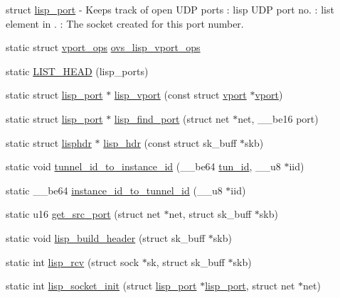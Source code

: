struct \hyperlink{structlisp__port}{lisp\+\_\+port} -\/ Keeps track of open U\+D\+P ports \+: lisp U\+D\+P port no. \+: list element in . \+: The socket created for this port number. \begin{DoxyCompactItemize}
\item 
static struct \hyperlink{structvport__ops}{vport\+\_\+ops} \hyperlink{linux_2vport-lisp_8c_a758306cfbd9fe092cc094dbf165e5cf7}{ovs\+\_\+lisp\+\_\+vport\+\_\+ops}
\item 
static \hyperlink{linux_2vport-lisp_8c_a73d3f5ee301d4ee3135ff6fdecaebbe5}{L\+I\+S\+T\+\_\+\+H\+E\+A\+D} (lisp\+\_\+ports)
\item 
static struct \hyperlink{structlisp__port}{lisp\+\_\+port} $\ast$ \hyperlink{linux_2vport-lisp_8c_af8f69fb0b9db12e9a324a9932011b302}{lisp\+\_\+vport} (const struct \hyperlink{structvport}{vport} $\ast$\hyperlink{structvport}{vport})
\item 
static struct \hyperlink{structlisp__port}{lisp\+\_\+port} $\ast$ \hyperlink{linux_2vport-lisp_8c_ac170aebcefa72b3bccd6431da43de59d}{lisp\+\_\+find\+\_\+port} (struct net $\ast$net, \+\_\+\+\_\+be16 port)
\item 
static struct \hyperlink{structlisphdr}{lisphdr} $\ast$ \hyperlink{linux_2vport-lisp_8c_ac717e897cb8473e6d34982cbfc5aeaaa}{lisp\+\_\+hdr} (const struct sk\+\_\+buff $\ast$skb)
\item 
static void \hyperlink{linux_2vport-lisp_8c_aa7e66c2b840ffa52ae39f24fc21c0eb5}{tunnel\+\_\+id\+\_\+to\+\_\+instance\+\_\+id} (\+\_\+\+\_\+be64 \hyperlink{flow_8h_aba5027d7a3d96f0f58dd8e607365934b}{tun\+\_\+id}, \+\_\+\+\_\+u8 $\ast$iid)
\item 
static \+\_\+\+\_\+be64 \hyperlink{linux_2vport-lisp_8c_af20b35bc9be7a0b1273028a96b99d06b}{instance\+\_\+id\+\_\+to\+\_\+tunnel\+\_\+id} (\+\_\+\+\_\+u8 $\ast$iid)
\item 
static u16 \hyperlink{linux_2vport-lisp_8c_a106a25589649bc37c3905cb00fb59f62}{get\+\_\+src\+\_\+port} (struct net $\ast$net, struct sk\+\_\+buff $\ast$skb)
\item 
static void \hyperlink{linux_2vport-lisp_8c_afacb726760b72b4d01c27f470d4b7a3a}{lisp\+\_\+build\+\_\+header} (struct sk\+\_\+buff $\ast$skb)
\item 
static int \hyperlink{linux_2vport-lisp_8c_afad2c3b20aa9688a25d14456469ed17d}{lisp\+\_\+rcv} (struct sock $\ast$sk, struct sk\+\_\+buff $\ast$skb)
\item 
static int \hyperlink{linux_2vport-lisp_8c_a91b2b04c344bf1a50d02d4084fabf482}{lisp\+\_\+socket\+\_\+init} (struct \hyperlink{structlisp__port}{lisp\+\_\+port} $\ast$\hyperlink{structlisp__port}{lisp\+\_\+port}, struct net $\ast$net)

\end{DoxyCompactItemize}
